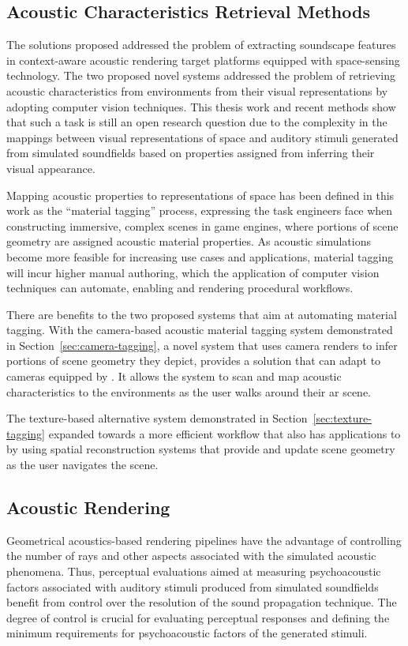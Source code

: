 \subsection{Acoustic Characteristics Retrieval Methods}
The solutions proposed addressed the problem of extracting soundscape features in context-aware acoustic rendering target platforms equipped with space-sensing technology. The two proposed novel systems addressed the problem of retrieving acoustic characteristics from environments from their visual representations by adopting computer vision techniques. This thesis work and recent methods show that such a task is still an open research question due to the complexity in the mappings between visual representations of space and auditory stimuli generated from simulated soundfields based on properties assigned from inferring their visual appearance.\par
Mapping acoustic properties to representations of space has been defined in this work as the ``material tagging'' process, expressing the task engineers face when constructing immersive, complex scenes in game engines, where portions of scene geometry are assigned acoustic material properties. As acoustic simulations become more feasible for increasing use cases and applications, material tagging will incur higher manual authoring, which the application of computer vision techniques can automate, enabling and rendering procedural workflows.\par
There are benefits to the two proposed systems that aim at automating material tagging. With the camera-based acoustic material tagging system demonstrated in Section~\ref{sec:camera-tagging}, a novel system that uses camera renders to infer portions of scene geometry they depict, provides a solution that can adapt to cameras equipped by . It allows the system to scan and map acoustic characteristics to the environments as the user walks around their \acrshort{ar} scene.

The texture-based alternative system demonstrated in Section~\ref{sec:texture-tagging} expanded towards a more efficient workflow that also has applications to  by using spatial reconstruction systems that provide and update scene geometry as the user navigates the scene.


\subsection{Acoustic Rendering}
Geometrical acoustics-based rendering pipelines have the advantage of controlling the number of rays and other aspects associated with the simulated acoustic phenomena. Thus, perceptual evaluations aimed at measuring psychoacoustic factors associated with auditory stimuli produced from simulated soundfields benefit from control over the resolution of the sound propagation technique. The degree of control is crucial for evaluating perceptual responses and defining the minimum requirements for psychoacoustic factors of the generated stimuli.\par

